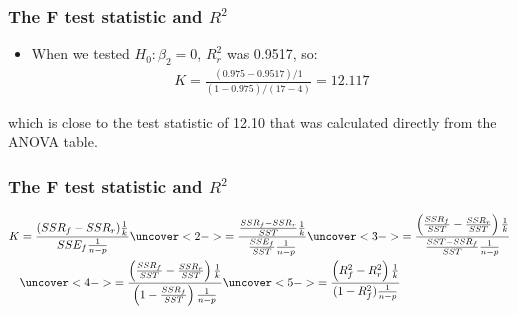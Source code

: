 \documentclass[handout]{beamer}\usepackage[]{graphicx}\usepackage[]{color}
\numberwithin{equation}{section}
\begin{document}
\begin{frame}
\frametitle{The F test statistic and $R^2$}
\begin{itemize}
\item When we tested $H_0: \beta_2 = 0$, $R^2_r$ was 0.9517, so:
\pause \begin{align*}
K = \frac{(0.975  - 0.9517)/ 1}{(1-0.975)/(17-4)} = 12.117
\end{align*}
\end{itemize}
\pause which is close to the test statistic of 12.10 that was calculated directly from the ANOVA table.
\end{frame}

\begin{frame}
\frametitle{The F test statistic and $R^2$}
\begin{align*}
K &= \frac{(SSR_f - SSR_r) \frac{1}{k}}{SSE_f \frac{1}{n-p}} \uncover<2->{= \frac{\frac{SSR_f - SSR_r}{SST} \frac{1}{k}}{\frac{SSE_f}{SST} \frac{1}{n-p}}} \uncover<3->{ = \frac{\left (\frac{SSR_f }{SST}- \frac{SSR_r}{SST} \right ) \frac{1}{k}}{\frac{SST - SSR_f}{SST} \frac{1}{n-p}}} \\
&\uncover<4->{= \frac{\left (\frac{SSR_f }{SST}- \frac{SSR_r}{SST} \right ) \frac{1}{k}}{ \left ( 1 - \frac{SSR_f}{SST} \right )  \frac{1}{n-p}}} \uncover<5->{ =  \frac{\left (R^2_f - R^2_r \right ) \frac{1}{k}}{(1 - R^2_f) \frac{1}{n-p}}}
\end{align*}
\end{frame}
\end{document}
